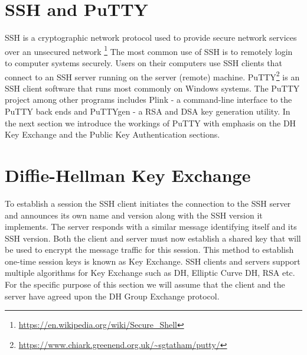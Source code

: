 \documentclass{report}
\begin{document}
\section{SSH and PuTTY}
SSH is a cryptographic network protocol used to provide secure network services over an unsecured network
\footnote{\url{https://en.wikipedia.org/wiki/Secure_Shell}}
The most common use of SSH is to remotely login to computer systems securely. Users on their computers use SSH clients that connect to an SSH server running on the server (remote) machine. PuTTY\footnote{\url{https://www.chiark.greenend.org.uk/~sgtatham/putty/}} is an SSH client software that runs most commonly on Windows systems. The PuTTY project among other programs includes Plink - a command-line interface to the PuTTY back ends and PuTTYgen - a RSA and DSA key generation utility. In the next section we introduce the workings of PuTTY with emphasis on the DH Key Exchange and the Public Key Authentication sections.
\section{Diffie-Hellman Key Exchange}
To establish a session the SSH client initiates the connection to the SSH server and announces its own name and version along with the SSH version it implements. The server responds with a similar message identifying itself and its SSH version. Both the client and server must now establish a shared key that will be used to encrypt the message traffic for this session. This method to establish one-time session keys is known as Key Exchange. SSH clients and servers support multiple algorithms for Key Exchange \cite{rfc4253} such as DH, Elliptic Curve DH, RSA etc. For the specific purpose of this section we will assume that the client and the server have agreed upon the DH Group Exchange protocol.\par
\end{document}
